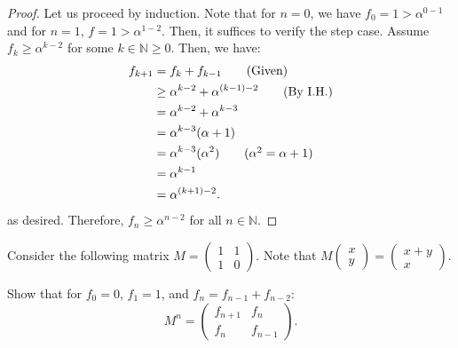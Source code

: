 \documentclass[a4paper]{article}
\begin{document}
\begin{proof}
	Let us proceed by induction. Note that for \( n=0 \), we have \( f_{0}=1>\alpha ^{0-1} \) and for \( n=1 \), \( f=1>\alpha ^{1-2}  \). Then, it suffices to verify the step case. Assume \( f_k \ge \alpha ^{k-2}  \) for some \( k \in \mathbb{N} \ge 0 \). Then, we have:
	\begin{align*}
		f_{k+1}&=f_k+f_{k-1} \tag{Given} \\
					 &\ge \alpha ^{k-2}+\alpha ^{(k-1)-2}   \tag{By I.H.} \\
					 &=\alpha ^{k-2} + \alpha ^{k-3} \\
					 &=\alpha ^{k-3}(\alpha +1) \\
						&=\alpha ^{k-3}(\alpha ^{2}) \tag{\(\alpha ^{2}=\alpha +1\)} \\
						&=\alpha ^{k-1} \\
						&=\alpha ^{(k+1)-2} 
	.\end{align*}
	as desired. Therefore, \( f_n \ge \alpha ^{n-2}  \) for all \( n \in \mathbb{N} \).
\end{proof}

\begin{eg}
	Consider the following matrix \( M = \begin{pmatrix} 1 & 1 \\ 1 & 0 \end{pmatrix}  \). Note that \( M\begin{pmatrix} x \\ y \end{pmatrix} =\begin{pmatrix} x + y \\ x \end{pmatrix}  \).

	Show that for \( f_{0}=0\), \(f_{1}=1 \), and \( f_n=f_{n-1}+f_{n-2} \): \[
		M^n = \begin{pmatrix} f_{n+1} & f_n \\ f_n & f_{n-1} \end{pmatrix} 
	.\] 
\end{eg}
\end{document}
